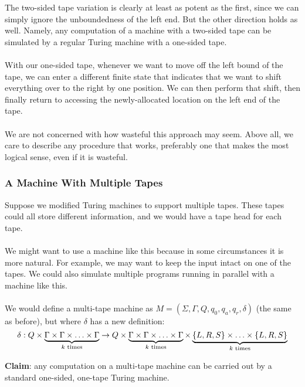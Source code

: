 \documentclass[]{article}
\DeclarePairedDelimiter{\set}{\lbrace}{\rbrace}
\theoremstyle{definition}
\begin{document}
        The two-sided tape variation is clearly at least as potent as the first, since we can simply ignore the unboundedness of the left end. But the other direction holds as well. Namely, any computation of a machine with a two-sided tape can be simulated by a regular Turing machine with a one-sided tape.
        \\ \\
        With our one-sided tape, whenever we want to move off the left bound of the tape, we can enter a different finite state that indicates that we want to shift everything over to the right by one position. We can then perform that shift, then finally return to accessing the newly-allocated location on the left end of the tape.
        \\ \\
        We are not concerned with how wasteful this approach may seem. Above all, we care to describe any procedure that works, preferably one that makes the most logical sense, even if it is wasteful.

      \subsubsection{A Machine With Multiple Tapes}
        Suppose we modified Turing machines to support multiple tapes. These tapes could all store different information, and we would have a tape head for each tape.
        \\ \\
        We might want to use a machine like this because in some circumstances it is more natural. For example, we may want to keep the input intact on one of the tapes. We could also simulate multiple programs running in parallel with a machine like this.
        \\ \\
        We would define a multi-tape machine as $M = (\Sigma, \Gamma, Q, q_0, q_a, q_r, \delta)$ (the same as before), but where $\delta$ has a new definition:
        $$
          \delta: Q \times \underbrace{\Gamma \times \Gamma \times \ldots \times \Gamma}_{k \text{ times}} \to Q \times \underbrace{\Gamma \times \Gamma \times \ldots \times \Gamma}_{k \text{ times}} \times \underbrace{\set{L, R, S} \times \ldots \times \set{L, R, S}}_{k \text{ times}}
        $$

        \textbf{Claim}: any computation on a multi-tape machine can be carried out by a standard one-sided, one-tape Turing machine.
\end{document}

